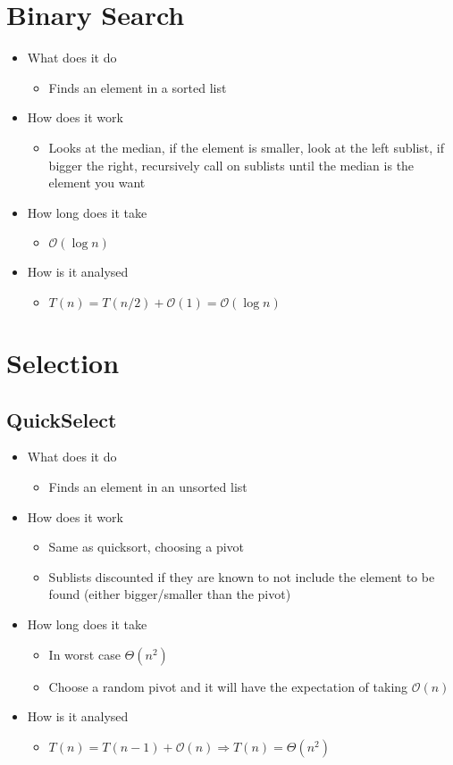 \documentclass{article}[18pt]
\begin{document}
\section{Binary Search}
\begin{itemize}
	\item What does it do
	\begin{itemize}
		\item Finds an element in a sorted list
	\end{itemize}
	\item How does it work
	\begin{itemize}
		\item Looks at the median, if the element is smaller, look at the left sublist, if bigger the right, recursively call on sublists until the median is the element you want
	\end{itemize}
	\item How long does it take
	\begin{itemize}
		\item $\mathcal{O}(\log n)$
	\end{itemize}
	\item How is it analysed
	\begin{itemize}
		\item $T(n)=T(n/2)+\mathcal{O}(1)=\mathcal{O}(\log n)$
	\end{itemize}
\end{itemize}
\section{Selection}
\subsection{QuickSelect}
\begin{itemize}
	\item What does it do
	\begin{itemize}
		\item Finds an element in an unsorted list
	\end{itemize}
	\item How does it work
	\begin{itemize}
		\item Same as quicksort, choosing a pivot
		\item Sublists discounted if they are known to not include the element to be found (either bigger/smaller than the pivot)
	\end{itemize}
	\item How long does it take
	\begin{itemize}
		\item In worst case $\Theta(n^2)$
		\item Choose a random pivot and it will have the expectation of taking $\mathcal{O}(n)$
	\end{itemize}
	\item How is it analysed
	\begin{itemize}
		\item $T(n)=T(n-1)+\mathcal{O}(n) \Rightarrow T(n)=\Theta(n^2)$
	\end{itemize}
\end{itemize}
\end{document}
